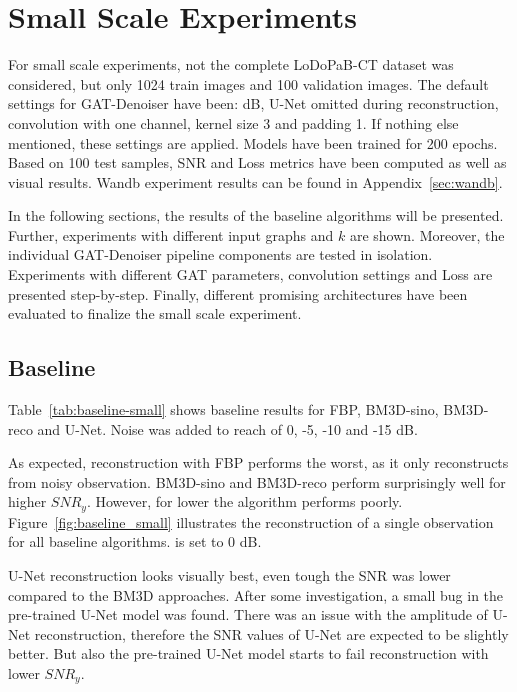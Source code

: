 \section{Small Scale Experiments}
For small scale experiments, not the complete LoDoPaB-CT dataset was considered, but only 1024 train images
and 100 validation images. 
The default settings for GAT-Denoiser have been:  dB, U-Net omitted during reconstruction, 
convolution with one channel, kernel size 3 and padding 1. 
If nothing else mentioned, these settings are applied.
Models have been trained for 200 epochs. Based on 100 test samples,
SNR and Loss metrics have been computed as well as visual results. 
Wandb experiment results can be found in Appendix~\ref{sec:wandb}.

In the following sections, the results of the baseline algorithms will be presented.
Further, experiments with different input graphs and $k$ are shown. 
Moreover, the individual GAT-Denoiser pipeline components are tested in isolation.
Experiments with different GAT parameters, convolution settings and Loss are presented step-by-step.
Finally, different promising architectures have been evaluated to finalize the small scale experiment.


\subsection{Baseline}

Table~\ref{tab:baseline-small} shows baseline results for FBP, BM3D-sino, BM3D-reco and U-Net.
Noise was added to reach \snry of 0, -5, -10 and -15 dB.

As expected, reconstruction with FBP performs the worst, as it only reconstructs from noisy observation.
BM3D-sino and BM3D-reco perform surprisingly well for higher $\textit{SNR}_y$.
However, for lower \snry the algorithm performs poorly.
Figure~\ref{fig:baseline_small} illustrates the reconstruction of a single
observation for all baseline algorithms. \snry is set to 0 dB.

U-Net reconstruction looks visually best, even tough the SNR was lower compared to the BM3D approaches.
After some investigation, a small bug in the pre-trained U-Net model was found.
There was an issue with the amplitude of U-Net reconstruction,
therefore the SNR values of U-Net are expected to be slightly better.
But also the pre-trained U-Net model starts to fail reconstruction with lower $\textit{SNR}_y$.


